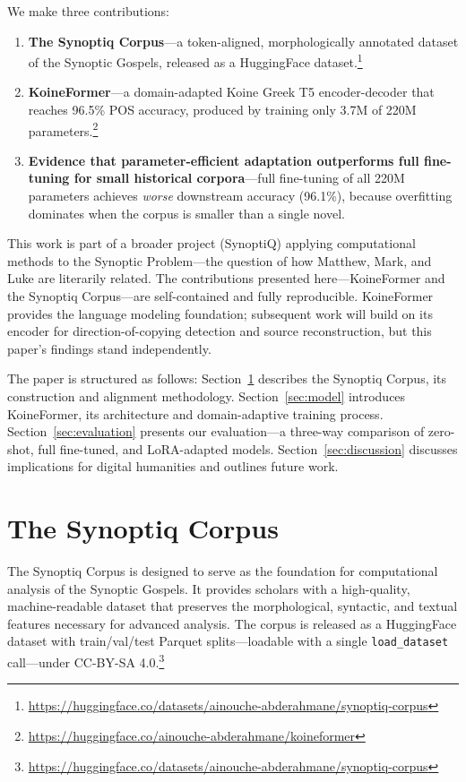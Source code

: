 \documentclass[11pt,letterpaper]{article}
\begin{document}
We make three contributions:

\begin{enumerate}
\item \textbf{The Synoptiq Corpus}---a token-aligned, morphologically annotated dataset of the Synoptic Gospels, released as a HuggingFace dataset.\footnote{\url{https://huggingface.co/datasets/ainouche-abderahmane/synoptiq-corpus}}

\item \textbf{KoineFormer}---a domain-adapted Koine Greek T5 encoder-decoder that reaches 96.5\% POS accuracy, produced by training only 3.7M of 220M parameters.\footnote{\url{https://huggingface.co/ainouche-abderahmane/koineformer}}

\item \textbf{Evidence that parameter-efficient adaptation outperforms full fine-tuning for small historical corpora}---full fine-tuning of all 220M parameters achieves \emph{worse} downstream accuracy (96.1\%), because overfitting dominates when the corpus is smaller than a single novel.
\end{enumerate}

This work is part of a broader project (SynoptiQ) applying computational methods to the Synoptic Problem---the question of how Matthew, Mark, and Luke are literarily related.  The contributions presented here---KoineFormer and the Synoptiq Corpus---are self-contained and fully reproducible.  KoineFormer provides the language modeling foundation; subsequent work will build on its encoder for direction-of-copying detection and source reconstruction, but this paper's findings stand independently.

The paper is structured as follows: Section~\ref{sec:corpus} describes the Synoptiq Corpus, its construction and alignment methodology. Section~\ref{sec:model} introduces KoineFormer, its architecture and domain-adaptive training process. Section~\ref{sec:evaluation} presents our evaluation---a three-way comparison of zero-shot, full fine-tuned, and LoRA-adapted models. Section~\ref{sec:discussion} discusses implications for digital humanities and outlines future work.

\section{The Synoptiq Corpus}
\label{sec:corpus}

The Synoptiq Corpus is designed to serve as the foundation for computational analysis of the Synoptic Gospels. It provides scholars with a high-quality, machine-readable dataset that preserves the morphological, syntactic, and textual features necessary for advanced analysis. The corpus is released as a HuggingFace dataset with train/val/test Parquet splits---loadable with a single \texttt{load\_dataset} call---under CC-BY-SA 4.0.\footnote{\url{https://huggingface.co/datasets/ainouche-abderahmane/synoptiq-corpus}}
\end{document}
